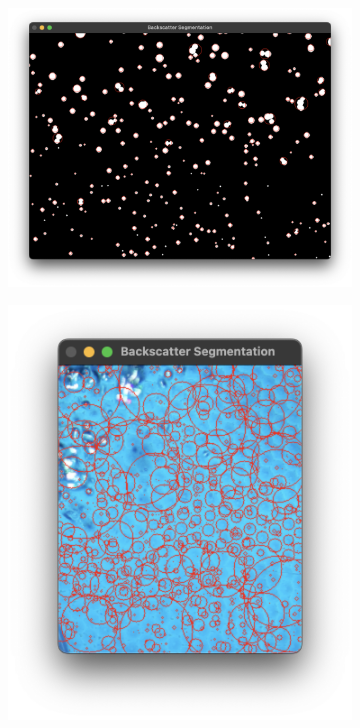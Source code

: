 \begin{figure}[H]
    \centering
    \begin{subfigure}{.48\textwidth}
        \centering
        \includegraphics[width=1\linewidth]{assets/sys_sim.png}
        \caption{}
        \label{fig:sys_sim}
    \end{subfigure}
    \hfill
    \begin{subfigure}{.25\textwidth}
        \centering
        \includegraphics[width=1\linewidth]{assets/sys_histequ.png}

\end{subfigure}
\end{figure}
